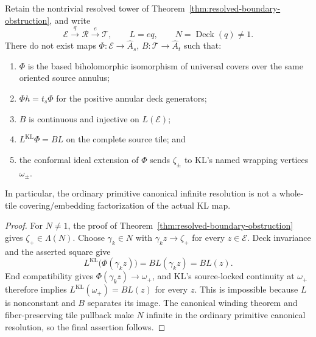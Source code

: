 \begin{proposition}\label{prop:whole-tile-no-go}
Retain the nontrivial resolved tower of Theorem~\ref{thm:resolved-boundary-obstruction}, and write
\[
\mathcal E\xrightarrow{\ q\ }\mathcal R\xrightarrow{\ e\ }\mathcal T,\qquad L=eq,\qquad N=\operatorname{Deck}(q)\neq 1 .
\]
There do not exist maps \(\Phi:\mathcal E\to\hat A_s\), \(B:\mathcal T\to\hat A_t\) such that:
\begin{enumerate}
\item \(\Phi\) is the based biholomorphic isomorphism of universal covers over the same oriented source annulus;
\item \(\Phi h=t_s\Phi\) for the positive annular deck generators;
\item \(B\) is continuous and injective on \(L(\mathcal E)\);
\item \(L^{\mathrm{KL}}\Phi=BL\) on the complete source tile; and
\item the conformal ideal extension of \(\Phi\) sends \(\zeta_{\pm}\) to KL's named wrapping vertices \(\omega_{\pm}\).
\end{enumerate}
In particular, the ordinary primitive canonical infinite resolution is not a whole-tile covering/embedding factorization of the actual KL map.
\end{proposition}

\begin{proof}
For \(N\neq 1\), the proof of Theorem~\ref{thm:resolved-boundary-obstruction} gives \(\zeta_+\in\Lambda(N)\). Choose \(\gamma_k\in N\) with \(\gamma_k z\to\zeta_+\) for every \(z\in\mathcal E\). Deck invariance and the asserted square give
\[
L^{\mathrm{KL}}\bigl(\Phi(\gamma_k z)\bigr)=BL(\gamma_k z)=BL(z).
\]
End compatibility gives \(\Phi(\gamma_k z)\to\omega_+\), and KL's source-locked continuity at \(\omega_+\) therefore implies \(L^{\mathrm{KL}}(\omega_+)=BL(z)\) for every \(z\). This is impossible because \(L\) is nonconstant and \(B\) separates its image. The canonical winding theorem and fiber-preserving tile pullback make \(N\) infinite in the ordinary primitive canonical resolution, so the final assertion follows.
\end{proof}